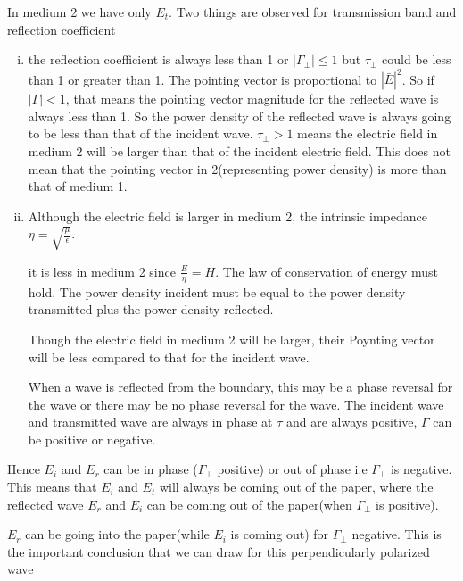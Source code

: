 In medium 2 we have only $E_{t}$. Two things are observed for transmission band and reflection  coefficient
\begin{enumerate}[(i)]
\item the reflection coefficient is always  less than 1 or $|\Gamma_{\bot}| \leq 1$ but $\tau_{\bot}$ could be less than 1 or greater than 1. The pointing vector is proportional  to $|\bar{E}|^{2}$. So if $|\Gamma|< 1$, that means the pointing vector magnitude for the reflected wave is always less than  1. So the power density of the reflected wave is always going to be less than that of the incident wave.  $\tau_{\bot} > 1$ means the electric field in medium 2 will be larger than that of the incident electric field. This does not mean that the pointing vector in 2(representing power density) is more than that of medium 1.

\item Although the electric field is larger in medium 2, the intrinsic impedance $\eta=\sqrt{\frac{\mu}{\epsilon}}$.

it is less in medium 2 since $\frac{E}{\eta} =H$. The law of conservation of energy must hold. The power density incident must be equal to the power density transmitted plus the power density reflected.

Though the electric field in medium 2 will be larger, their Poynting vector will be less compared to that for the incident wave.

When a wave is reflected from the boundary, this may be a phase reversal for the wave or there may be no phase reversal for the wave. The incident wave and transmitted wave are always in phase at $\tau$ and are always positive, $\Gamma$ can be positive or negative.
\end{enumerate}
Hence $E_{i}$ and $E_{r}$ can be in phase ($\Gamma_{\perp}$ positive) or out of phase i.e $\Gamma_{\perp}$ is negative. This means that $E_{i}$ and $E_{t}$ will always be coming out of the paper, where the reflected wave $E_{r}$ and $E_{i}$ can be coming out of the paper(when $\Gamma_{\perp}$ is positive).

$E_{r}$ can be going into the paper(while $E_{i}$ is coming out) for $\Gamma_{\perp}$ negative. This is the important conclusion that we can draw for this perpendicularly polarized wave


